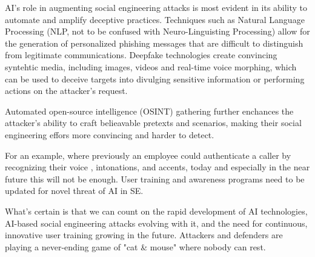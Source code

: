 AI's role in augmenting social engineering attacks is most evident in its ability to automate and amplify deceptive practices. Techniques such as Natural Language Processing (NLP, not to be confused with Neuro-Linguisting Processing) allow for the generation of personalized phishing messages that are difficult to distinguish from legitimate communications. Deepfake technologies create convincing syntehtic media, including images, videos and real-time voice morphing, which can be used to deceive targets into divulging sensitive information or performing actions on the attacker's request.

Automated open-source intelligence (OSINT) gathering further enchances the attacker's ability to craft belieavable pretexts and scenarios, making their social engineering effors more convincing and harder to detect.

For an example, where previously an employee could authenticate a caller by recognizing their voice \citep{mitnickArtDeceptionControlling2003}, intonations, and accents, today and especially in the near future this will not be enough. User training and awareness programs need to be updated for novel threat of AI in SE.


What's certain is that we can count on the rapid development of AI technologies, AI-based social engineering attacks evolving with it, and the need for continuous, innovative user training growing in the future. Attackers and defenders are playing a never-ending game of "cat \& mouse" where nobody can rest.





